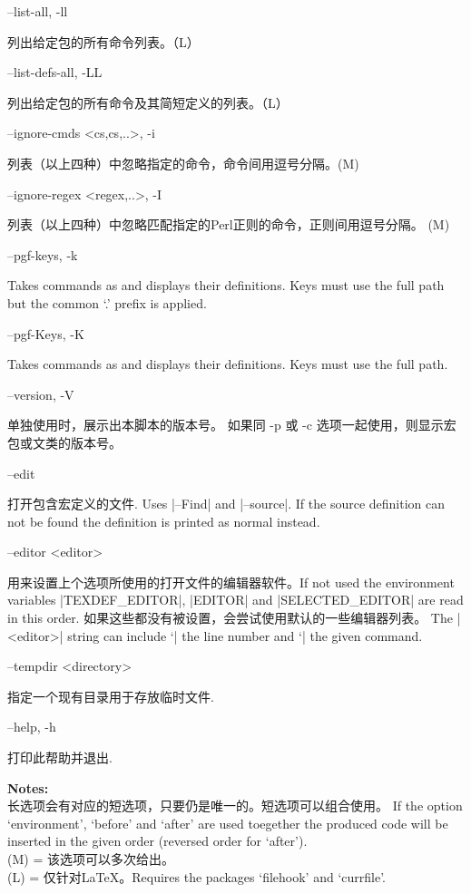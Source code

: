 \documentclass{article}
\newenvironment{options}{%
    \def\cstart{\begingroup\ttfamily\par\noindent\ignorespaces}%
    \def\csep{\endgroup\begingroup\list {}{}\item \relax}%
    \def\cend{\endlist\par\medskip\endgroup\cstart}%
    \cstart
}{%
    \endgroup
}
\begin{document}
\begin{options}
--list-all, -ll                                    \csep 列出给定包的所有命令列表。（L）\cend
  --list-defs-all, -LL                               \csep 列出给定包的所有命令及其简短定义的列表。（L）\cend
  --ignore-cmds \MacroArgs<cs,cs,..>,  -i            \csep 列表（以上四种）中忽略指定的命令，命令间用逗号分隔。(M)\cend
  --ignore-regex \MacroArgs<regex,..>, -I            \csep 列表（以上四种）中忽略匹配指定的Perl正则的命令，正则间用逗号分隔。 (M)\cend
  --pgf-keys, -k                                     \csep Takes commands as  and displays their definitions. Keys must use the full path but the common `.\@cmd' prefix is applied.\cend
  --pgf-Keys, -K                                     \csep Takes commands as  and displays their definitions. Keys must use the full path.\cend
  --version, -V                                      \csep 单独使用时，展示出本脚本的版本号。
                                                       如果同 -p 或 -c 选项一起使用，则显示宏包或文类的版本号。\cend
  --edit                                             \csep 打开包含宏定义的文件. Uses |--Find| and |--source|.
                                                           If the source definition can not be found the definition is printed as normal instead. \cend
  --editor <editor>                                  \csep 用来设置上个选项所使用的打开文件的编辑器软件。If not used the environment variables |TEXDEF_EDITOR|, |EDITOR| and
                                                       |SELECTED_EDITOR| are read in this order. 如果这些都没有被设置，会尝试使用默认的一些编辑器列表。
                                                       The |<editor>| string can include `|%
                                                       the line number and `|%
                                                       the given command.\cend
  --tempdir <directory>                              \csep 指定一个现有目录用于存放临时文件.\cend
  --help, -h                                         \csep 打印此帮助并退出.\cend
\end{options}

\noindent \textbf{Notes:}\\
长选项会有对应的短选项，只要仍是唯一的。短选项可以组合使用。
 If the option `environment', `before' and `after' are used toegether the
 produced code will be inserted in the given order (reversed order for `after').\\
 (M) = 该选项可以多次给出。\\
 (L) = 仅针对LaTeX。Requires the packages `filehook' and `currfile'.
\end{document}

